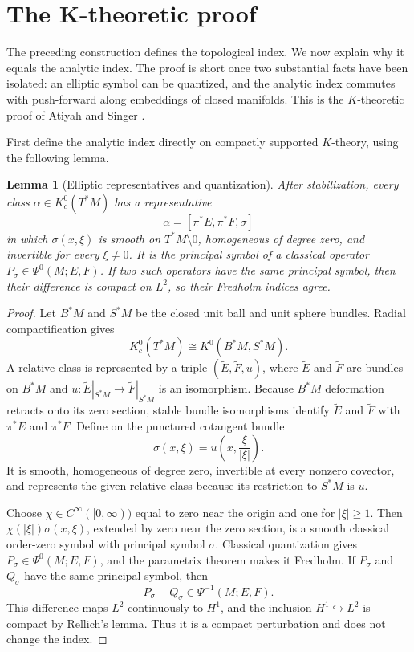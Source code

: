 \documentclass[11pt,oneside,reqno]{book}
\theoremstyle{plain}
\newtheorem{lemma}[theorem]{Lemma}
\theoremstyle{definition}
\theoremstyle{remark}
\begin{document}
\section{The K-theoretic proof}

The preceding construction defines the topological index. We now explain
why it equals the analytic index. The proof is short once two substantial
facts have been isolated: an elliptic symbol can be quantized, and the
analytic index commutes with push-forward along embeddings of closed
manifolds.  This is the \(K\)-theoretic proof of Atiyah and Singer
\cite{ASI,ABS}.

First define the analytic index directly on compactly supported
\(K\)-theory, using the following lemma.

\begin{lemma}[Elliptic representatives and quantization]\label{lem:quantization}
After stabilization, every class \(\alpha\in K_c^0(T^*M)\) has a
representative
\[
 \alpha=[\pi^*E,\pi^*F,\sigma]
\]
in which \(\sigma(x,\xi)\) is smooth on \(T^*M\setminus0\), homogeneous of
degree zero, and invertible for every \(\xi\ne0\).  It is the principal
symbol of a classical operator \(P_\sigma\in\Psi^0(M;E,F)\).  If two such
operators have the same principal symbol, then their difference is compact
on \(L^2\), so their Fredholm indices agree.
\end{lemma}

\begin{proof}
Let \(B^*M\) and \(S^*M\) be the closed unit ball and unit sphere bundles.
Radial compactification gives
\[
 K_c^0(T^*M)\cong K^0(B^*M,S^*M).
\]
A relative class is represented by a triple
\((\widetilde E,\widetilde F,u)\), where \(\widetilde E\) and
\(\widetilde F\) are bundles on \(B^*M\) and
\(u:\widetilde E|_{S^*M}\to\widetilde F|_{S^*M}\) is an isomorphism.
Because \(B^*M\) deformation retracts onto its zero section, stable bundle
isomorphisms identify \(\widetilde E\) and \(\widetilde F\) with
\(\pi^*E\) and \(\pi^*F\).  Define on the punctured cotangent bundle
\[
 \sigma(x,\xi)=u\!\left(x,\frac{\xi}{|\xi|}\right).
\]
It is smooth, homogeneous of degree zero, invertible at every nonzero
covector, and represents the given relative class because its restriction
to \(S^*M\) is \(u\).

Choose \(\chi\in C^\infty([0,\infty))\) equal to zero near the origin and
one for \(|\xi|\geq1\).  Then \(\chi(|\xi|)\sigma(x,\xi)\), extended by
zero near the zero section, is a smooth classical order-zero symbol with
principal symbol \(\sigma\).  Classical quantization gives
\(P_\sigma\in\Psi^0(M;E,F)\), and the parametrix theorem makes it Fredholm.
If \(P_\sigma\) and \(Q_\sigma\) have the same principal symbol, then
\[
 P_\sigma-Q_\sigma\in\Psi^{-1}(M;E,F).
\]
This difference maps \(L^2\) continuously to \(H^1\), and the inclusion
\(H^1\hookrightarrow L^2\) is compact by Rellich's lemma.  Thus it is a
compact perturbation and does not change the index.
\end{proof}
\end{document}
